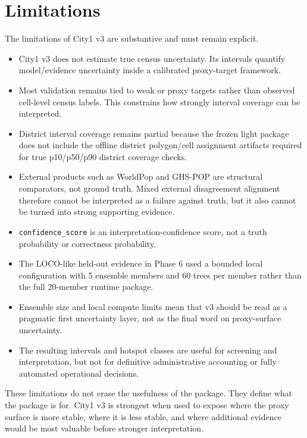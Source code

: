 \section{Limitations}

The limitations of City1 v3 are substantive and must remain explicit.

\begin{itemize}
\item City1 v3 does not estimate true census uncertainty. Its intervals quantify model/evidence uncertainty inside a calibrated proxy-target framework.
\item Most validation remains tied to weak or proxy targets rather than observed cell-level census labels. This constrains how strongly interval coverage can be interpreted.
\item District interval coverage remains partial because the frozen light package does not include the offline district polygon/cell assignment artifacts required for true p10/p50/p90 district coverage checks.
\item External products such as WorldPop and GHS-POP are structural comparators, not ground truth. Mixed external disagreement alignment therefore cannot be interpreted as a failure against truth, but it also cannot be turned into strong supporting evidence.
\item \texttt{confidence\_score} is an interpretation-confidence score, not a truth probability or correctness probability.
\item The LOCO-like held-out evidence in Phase 6 used a bounded local configuration with 5 ensemble members and 60 trees per member rather than the full 20-member runtime package.
\item Ensemble size and local compute limits mean that v3 should be read as a pragmatic first uncertainty layer, not as the final word on proxy-surface uncertainty.
\item The resulting intervals and hotspot classes are useful for screening and interpretation, but not for definitive administrative accounting or fully automated operational decisions.
\end{itemize}

These limitations do not erase the usefulness of the package. They define what the package is for. City1 v3 is strongest when used to expose where the proxy surface is more stable, where it is less stable, and where additional evidence would be most valuable before stronger interpretation.

